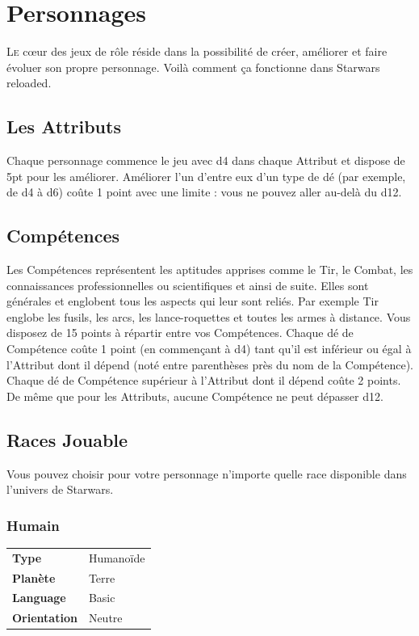 
\section{Personnages}
\lettrine{L}{e} c\oe{}ur des jeux de rôle réside dans la possibilité de créer, améliorer et faire évoluer son propre personnage. Voilà comment ça fonctionne dans {\jedifont Starwars reloaded}. 

\subsection{Les Attributs}
Chaque personnage commence le jeu avec d4 dans chaque Attribut et dispose de 5pt pour les améliorer. Améliorer l'un d'entre eux d’un type de dé (par exemple, de d4 à d6) coûte 1 point avec une limite : vous ne pouvez aller au-delà du d12.

\subsection{Compétences}
Les Compétences représentent les aptitudes apprises comme le Tir, le Combat, les connaissances professionnelles ou scientifiques et ainsi de suite. Elles sont générales et englobent tous les aspects qui leur sont reliés. Par exemple Tir englobe les fusils, les arcs, les lance-roquettes et toutes les armes à distance. Vous disposez de 15 points à répartir entre vos Compétences. Chaque dé de Compétence coûte 1 point (en commençant à d4) tant qu’il est inférieur ou égal à l’Attribut dont il dépend (noté entre parenthèses près du nom de la Compétence). Chaque dé de Compétence supérieur à l’Attribut dont il dépend coûte 2 points. De même que pour les Attributs, aucune Compétence ne peut dépasser d12.

\subsection{Races Jouable}
Vous pouvez choisir pour votre personnage n’importe quelle race disponible dans l'univers de Starwars. 

\subsubsection{Humain}
\begin{flushright}
\begin{tabular}{ l l }
	\textbf{Type} 			& Humanoïde \\
   	\textbf{Planète} 		& Terre \\
   	\textbf{Language} 		& Basic \\
   	\textbf{Orientation} 	& Neutre \\
\end{tabular}
\vspace{-60}
\end{flushright}


